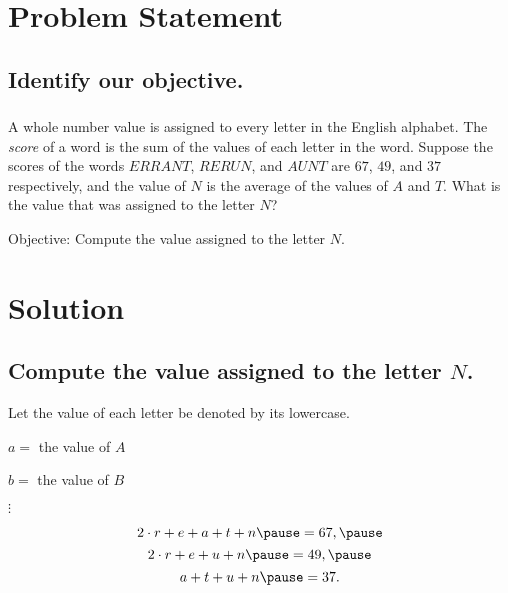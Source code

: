 \documentclass{beamer} %
\begin{document}
\begin{frame} %
  \titlepage
\end{frame}

\section{Problem Statement}

\subsection*{Identify our objective.}

\begin{frame}
  \frametitle{}
  A whole number value is assigned to every letter in the English alphabet. The \textit{score} of a word is the sum of the values of each letter in the word. Suppose the scores of the words $ERRANT$, $RERUN$, and $AUNT$ are $67$, $49$, and $37$ respectively, and the value of $N$ is the average of the values of $A$ and $T$. What is the value that was assigned to the letter $N$?\pause
  \begin{center}
    Objective: Compute the value assigned to the letter $N$.
  \end{center}
\end{frame}

\section{Solution}

\subsection*{Compute the value assigned to the letter $N$.}

\begin{frame}
  \begin{center}
    Let the value of each letter be denoted by its lowercase.\pause
    
    $a = $ the value of $A$\pause
    
    $b = $ the value of $B$\pause
    
    $\vdots$\pause
  \end{center}

  \begin{equation*}
    2\cdot r+e+a+t+n\pause=67,\pause
  \end{equation*}
  \begin{equation*}
    2\cdot r+e+u+n\pause=49,\pause
  \end{equation*}
  \begin{equation*}
    a+t+u+n\pause=37.
  \end{equation*}
\end{frame}
\end{document}
